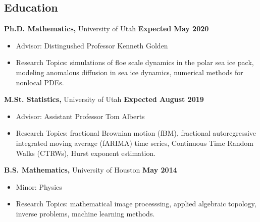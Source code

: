 \documentclass[margin,line]{res}
\begin{document}
\newcommand{\myname}{Huy Dinh}
\newlength{\mynamewidth}
\settowidth{\mynamewidth}{\namefont\myname}

\name{\hspace*{0.5\textwidth}\hspace{-0.5\mynamewidth} \myname \vspace*{.2in}}

\thispagestyle{empty}

\begin{resume}



\section{\sc Education}
{\bf Ph.D. Mathematics,} University of Utah \hfill {\bf Expected May 2020}\\
\vspace*{-.1in}
\begin{itemize} \setlength\itemsep{0em}
\item[ ] Advisor: Distingushed Professor Kenneth Golden
\item[ ] Research Topics: simulations of floe scale dynamics in the polar sea ice pack, modeling anomalous diffusion in sea ice dynamics, numerical methods for nonlocal PDEs.
\end{itemize}

{\bf M.St. Statistics,} University of Utah \hfill {\bf Expected August 2019}\\
\vspace*{-.1in}
\begin{itemize} \setlength\itemsep{0em}
\item[ ] Advisor: Assistant Professor Tom Alberts
\item[ ] Research Topics: fractional Brownian motion (fBM), fractional autoregressive integrated moving average (fARIMA) time series, Continuous Time Random Walks (CTRWs), Hurst exponent estimation.
\end{itemize}

{\bf B.S. Mathematics,} University of Houston \hfill {\bf May 2014}\\
\vspace*{-.1in}
\begin{itemize} \setlength\itemsep{0em}
\item[ ] Minor: Physics
\item[ ] Research Topics: mathematical image processsing, applied algebraic topology, inverse problems, machine learning methods.
\end{itemize}


\end{resume}
\end{document}

